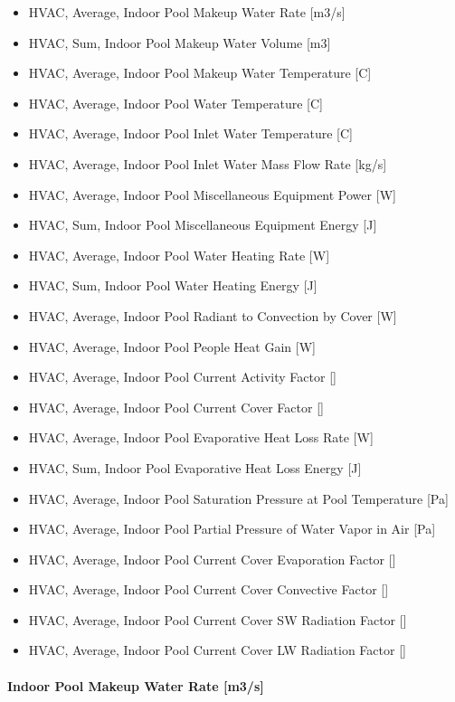 \begin{itemize}
\tightlist
\item
  HVAC, Average, Indoor Pool Makeup Water Rate {[}m3/s{]}
\item
  HVAC, Sum, Indoor Pool Makeup Water Volume {[}m3{]}
\item
  HVAC, Average, Indoor Pool Makeup Water Temperature {[}C{]}
\item
  HVAC, Average, Indoor Pool Water Temperature {[}C{]}
\item
  HVAC, Average, Indoor Pool Inlet Water Temperature {[}C{]}
\item
  HVAC, Average, Indoor Pool Inlet Water Mass Flow Rate {[}kg/s{]}
\item
  HVAC, Average, Indoor Pool Miscellaneous Equipment Power {[}W{]}
\item
  HVAC, Sum, Indoor Pool Miscellaneous Equipment Energy {[}J{]}
\item
  HVAC, Average, Indoor Pool Water Heating Rate {[}W{]}
\item
  HVAC, Sum, Indoor Pool Water Heating Energy {[}J{]}
\item
  HVAC, Average, Indoor Pool Radiant to Convection by Cover {[}W{]}
\item
  HVAC, Average, Indoor Pool People Heat Gain {[}W{]}
\item
  HVAC, Average, Indoor Pool Current Activity Factor {[]}
\item
  HVAC, Average, Indoor Pool Current Cover Factor {[]}
\item
  HVAC, Average, Indoor Pool Evaporative Heat Loss Rate {[}W{]}
\item
  HVAC, Sum, Indoor Pool Evaporative Heat Loss Energy {[}J{]}
\item
  HVAC, Average, Indoor Pool Saturation Pressure at Pool Temperature {[}Pa{]}
\item
  HVAC, Average, Indoor Pool Partial Pressure of Water Vapor in Air {[}Pa{]}
\item
  HVAC, Average, Indoor Pool Current Cover Evaporation Factor {[]}
\item
  HVAC, Average, Indoor Pool Current Cover Convective Factor {[]}
\item
  HVAC, Average, Indoor Pool Current Cover SW Radiation Factor {[]}
\item
  HVAC, Average, Indoor Pool Current Cover LW Radiation Factor {[]}
\end{itemize}

\paragraph{Indoor Pool Makeup Water Rate {[}m3/s{]}}\label{indoor-pool-makeup-water-rate-m3s}


